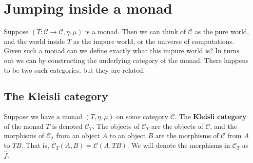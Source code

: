 \documentclass{article}
\let\mto\to
\let\to\relax
\newcommand{\to}{\rightarrow}
\newcommand{\cat}[1]{\mathcal{#1}}
\begin{document}
\section{Jumping inside a monad}
\label{sec:jumping_inside_a_monad}

Suppose $(T : \cat{C} \mto \cat{C},\eta,\mu)$ is a monad.  Then we can
think of $\cat{C}$ as the pure world, and the world inside $T$ as the
impure world, or the universe of computations.  Given such a monad can
we define exactly what this impure world is?  In turns out we can by
constructing the underlying category of the monad.  There happens to
be two such categories, but they are related.

\subsection{The Kleisli category}
\label{subsec:the_kleisli_category}
Suppose we have a monad $(T,\eta,\mu)$ on some category $\cat{C}$.
The \textbf{Kleisli category} of the monad $T$ is denoted $\cat{C}_T$.
The objects of $\cat{C}_T$ are the objects of $\cat{C}$, and the
morphisms of $\cat{C}_T$ from an object $A$ to an object $B$ are the
morphisms of $\cat{C}$ from $A$ to $TB$.  That is, $\cat{C}_T(A,B) =
\cat{C}(A,TB)$.  We will denote the morphisms in $\cat{C}_T$ as
$\hat{f}$.
\end{document}

